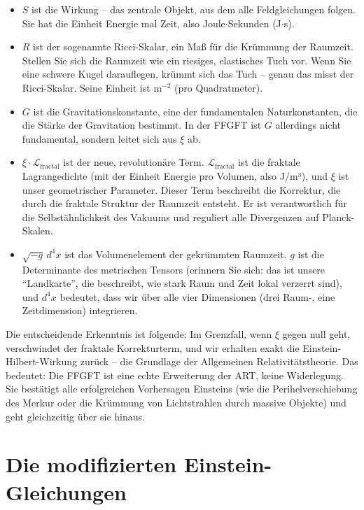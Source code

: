 \begin{itemize}[leftmargin=*]
\item \textbf{$S$} ist die Wirkung – das zentrale Objekt, aus dem alle Feldgleichungen folgen. Sie hat die Einheit Energie mal Zeit, also Joule$\cdot$Sekunden (J$\cdot$s).

\item \textbf{$R$} ist der sogenannte Ricci-Skalar, ein Maß für die Krümmung der Raumzeit. Stellen Sie sich die Raumzeit wie ein riesiges, elastisches Tuch vor. Wenn Sie eine schwere Kugel darauflegen, krümmt sich das Tuch – genau das misst der Ricci-Skalar. Seine Einheit ist $\text{m}^{-2}$ (pro Quadratmeter).

\item \textbf{$G$} ist die Gravitationskonstante, eine der fundamentalen Naturkonstanten, die die Stärke der Gravitation bestimmt. In der FFGFT ist $G$ allerdings nicht fundamental, sondern leitet sich aus $\xi$ ab.

\item \textbf{$\xi \cdot \mathcal{L}_{\text{fractal}}$} ist der neue, revolutionäre Term. $\mathcal{L}_{\text{fractal}}$ ist die fraktale Lagrangedichte (mit der Einheit Energie pro Volumen, also J/m³), und $\xi$ ist unser geometrischer Parameter. Dieser Term beschreibt die Korrektur, die durch die fraktale Struktur der Raumzeit entsteht. Er ist verantwortlich für die Selbstähnlichkeit des Vakuums und reguliert alle Divergenzen auf Planck-Skalen.

\item \textbf{$\sqrt{-g} \, d^4x$} ist das Volumenelement der gekrümmten Raumzeit. $g$ ist die Determinante des metrischen Tensors (erinnern Sie sich: das ist unsere \enquote{Landkarte}, die beschreibt, wie stark Raum und Zeit lokal verzerrt sind), und $d^4x$ bedeutet, dass wir über alle vier Dimensionen (drei Raum-, eine Zeitdimension) integrieren.
\end{itemize}

Die entscheidende Erkenntnis ist folgende: Im Grenzfall, wenn $\xi$ gegen null geht, verschwindet der fraktale Korrekturterm, und wir erhalten exakt die Einstein-Hilbert-Wirkung zurück – die Grundlage der Allgemeinen Relativitätstheorie. Das bedeutet: Die FFGFT ist eine echte Erweiterung der ART, keine Widerlegung. Sie bestätigt alle erfolgreichen Vorhersagen Einsteins (wie die Perihelverschiebung des Merkur oder die Krümmung von Lichtstrahlen durch massive Objekte) und geht gleichzeitig über sie hinaus.

\section{Die modifizierten Einstein-Gleichungen}

